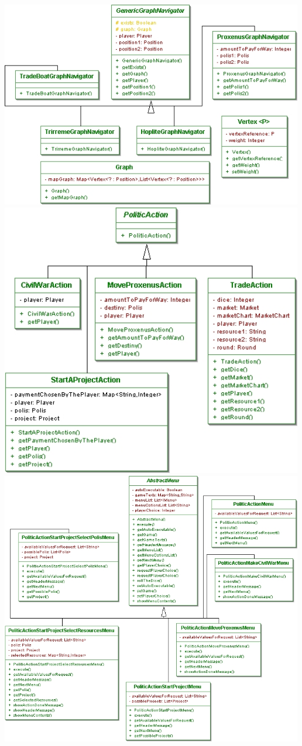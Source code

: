 \documentclass[11 pt]{book}
\begin{document}
\begin{center}
		    \includegraphics[width=500px]{design-uml/iteration7/navigation.jpg}
		    \includegraphics[width=500px]{design-uml/iteration7/politicactions.jpg}
		    \includegraphics[width=500px]{design-uml/iteration7/politicactions1.jpg}

\end{center}
\end{document}
